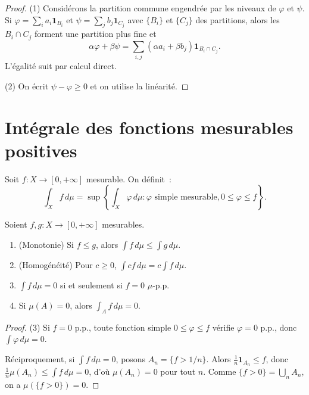 \begin{proof}
(1) Consid\'erons la partition commune engendr\'ee par les niveaux de $\varphi$ et
$\psi$. Si $\varphi = \sum_i a_i \mathbf{1}_{B_i}$ et $\psi = \sum_j b_j
\mathbf{1}_{C_j}$ avec $\{B_i\}$ et $\{C_j\}$ des partitions, alors les
$B_i \cap C_j$ forment une partition plus fine et
\[
\alpha\varphi + \beta\psi = \sum_{i,j} (\alpha a_i + \beta b_j)
\mathbf{1}_{B_i \cap C_j}.
\]
L'\'egalit\'e suit par calcul direct.

(2) On \'ecrit $\psi - \varphi \geq 0$ et on utilise la lin\'earit\'e.
\end{proof}

\section{Int\'egrale des fonctions mesurables positives}

\begin{definition}
Soit $f : X \to [0, +\infty]$ mesurable. On d\'efinit~:
\[
\int_X f\, d\mu = \sup\left\{\int_X \varphi\, d\mu :
\varphi \text{ simple mesurable}, 0 \leq \varphi \leq f\right\}.
\]
\end{definition}

\begin{proposition}
Soient $f, g : X \to [0, +\infty]$ mesurables.
\begin{enumerate}
    \item (Monotonie) Si $f \leq g$, alors $\int f\, d\mu \leq \int g\, d\mu$.
    \item (Homog\'en\'eit\'e) Pour $c \geq 0$, $\int cf\, d\mu = c \int f\, d\mu$.
    \item $\int f\, d\mu = 0$ si et seulement si $f = 0$ $\mu$-p.p.
    \item Si $\mu(A) = 0$, alors $\int_A f\, d\mu = 0$.
\end{enumerate}
\end{proposition}

\begin{proof}
(3) Si $f = 0$ p.p., toute fonction simple $0 \leq \varphi \leq f$ v\'erifie
$\varphi = 0$ p.p., donc $\int \varphi\, d\mu = 0$.

R\'eciproquement, si $\int f\, d\mu = 0$, posons $A_n = \{f > 1/n\}$. Alors
$\frac{1}{n} \mathbf{1}_{A_n} \leq f$, donc
$\frac{1}{n} \mu(A_n) \leq \int f\, d\mu = 0$, d'o\`u $\mu(A_n) = 0$ pour tout $n$.
Comme $\{f > 0\} = \bigcup_n A_n$, on a $\mu(\{f > 0\}) = 0$.
\end{proof}

